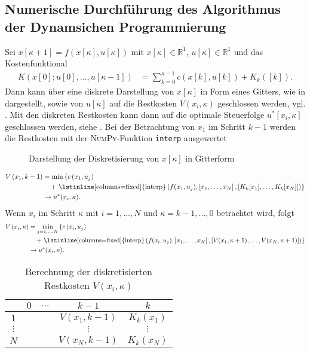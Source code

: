 \subsection{Numerische Durchführung des Algorithmus der Dynamsichen Programmierung}
Sei $x[\kappa+1] = f\left(x[\kappa],u[\kappa] \right)$ mit $x[\kappa]\in\mathbb{R}^1$, $u[\kappa]\in\mathbb{R}^1$ und das Kostenfunktional
\begin{align*}
	K\left(x[0];u[0],\ldots,u[\kappa-1] \right) & = \sum\limits_{k=0}^{\kappa-1}c\left(x[k],u[k] \right)+K_k([k]).
\end{align*}
Dann kann über eine diskrete Darstellung von $x[\kappa]$ in Form eines Gitters, wie in  dargestellt, sowie von
$u[\kappa]$ auf die Restkosten $V(x_i,\kappa)$ geschlossen werden, vgl. . Mit den diskreten Restkosten kann dann
auf die optimale Steuerfolge $u^{\ast}[x_i,\kappa]$ geschlossen werden, siehe . Bei der Betrachtung von $x_1$ im
Schritt $k-1$ werden die Restkosten mit der \textsc{NumPy}-Funktion \lstinline[columns=fixed]{interp} ausgewertet
\begin{figure}[!htb]
	\centering
	
	\caption{Darstellung der Diskretisierung von $x[\kappa]$ in Gitterform}
	\label{fig:kap_3_dyn_prog_xgitter}
\end{figure}
\begin{align*}
	V\left(x_1, k-1 \right) & = \min\left\{c\left(x_1,u_j \right)\right.\\
	& \quad + \left.\text{\lstinline[columns=fixed]{interp}}\left(f(x_1,u_j),\left[x_1,\ldots,x_N\right],\left[K_k[x_1],\ldots,K_k[x_N] \right] \right)
	\right\}\\
	& \rightarrow u^{\ast}(x_i,\kappa).
\end{align*}
Wenn $x_i$ im Schritt $\kappa$ mit $i=1,\ldots,N$ und $\kappa=k-1,\ldots,0$ betrachtet wird, folgt
\begin{align*}
	V\left(x_i,\kappa \right) & = \min\limits_{j=1,\ldots,N}\left\{c\left(x_i,u_j \right)\right.\\
	&\quad + \left.\text{\lstinline[columns=fixed]{interp}}\left(f(x_i,u_j), \left[x_1,\ldots,x_N \right],\left[V(x_1,\kappa+1),\ldots,V(x_N,\kappa+1)
	\right] \right) \right\}\\
	& \rightarrow u^{\ast}(x_i,\kappa).
\end{align*}
\begin{table}[htb]
\caption{Berechnung der diskretisierten Restkosten $V(x_i,\kappa)$}
\centering
\begin{tabular}{|c|cccc|}
	\hline
	\diagbox{$i$}{$\kappa$} 	& $0$ 	& $\ldots$ 	& $k-1$ 		& $k$\\\hline
	$1$							&		&			& $V(x_1,k-1)$	& $K_k(x_1)$\\
	$\vdots$					&		&			& $\vdots$		& $\vdots$\\
	$N$							&		&			& $V(x_N,k-1)$	& $K_k(x_N)$\\\hline
\end{tabular}
\label{tab:kap_3_dyn_prog_restkosten}
\end{table}
